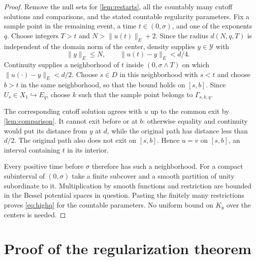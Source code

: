 \documentclass[11pt]{amsart}
\theoremstyle{definition}
\theoremstyle{remark}
\newcommand{\norm}[2][]{\lVert #2\rVert_{#1}}
\numberwithin{equation}{section}
\begin{document}
\begin{proof}
Remove the null sets for \cref{lem:restarts}, all the countably many
cutoff solutions and comparisons, and the stated countable regularity
parameters. Fix a sample point in the remaining event, a time
$t\in(0,\sigma)$, and one of the exponents $q$. Choose integers
$T>t$ and $N>\norm[E]{u(t)}+2$. Since the radius $d(N,q,T)$ is
independent of the domain norm of the center, density supplies
$y\in\mathcal Y$ with
\[
 \norm[E]{y}\le N,\qquad \norm[E]{u(t)-y}<d/4.
\]
Continuity supplies a neighborhood of $t$ inside $(0,\sigma\wedge T)$
on which $\norm[E]{u(\cdot)-y}<d/2$. Choose $s\in D$ in this
neighborhood with $s<t$ and choose $b>t$ in the same neighborhood,
so that the bound holds on $[s,b]$. Since $U_s\in X_1\hookrightarrow
E_q$, choose $k$ such that the sample point belongs to
$\Gamma_{s,k,q}$.

The corresponding cutoff solution agrees with $u$ up to the common
exit by \cref{lem:comparison}. It cannot exit before or at $b$:
otherwise equality and continuity would put its distance from $y$
at $d$, while the original path has distance less than $d/2$.
The original path also does not exit on $[s,b]$. Hence $u=v$ on
$[s,b]$, an interval containing $t$ in its interior.

Every positive time before $\sigma$ therefore has such a neighborhood.
For a compact subinterval of $(0,\sigma)$ take a finite subcover and
a smooth partition of unity subordinate to it. Multiplication by
smooth functions and restriction are bounded in the Bessel potential
spaces in question. Pasting the finitely many restrictions proves
\eqref{eq:highq} for the countable parameters. No uniform bound on
$K_y$ over the centers is needed.
\end{proof}

\section{Proof of the regularization theorem}
\end{document}
